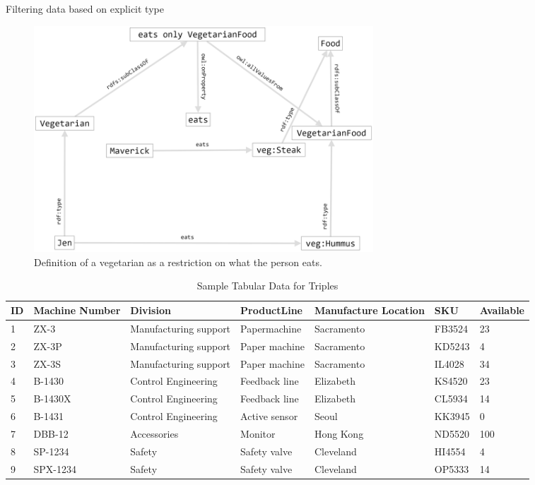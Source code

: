 \begin{challenge}{Filtering data based on explicit type}
\begin{figure}
\centering
\includegraphics[width=5in]{SWWOv3/media/ch12/figure12-9.png}
\caption{Definition of a vegetarian as a restriction on what the person eats.}
\label{fig:ch12.09}
\end{figure}


\begin{table}[h]
\centering
\begin{tabular}{||l l l l l l l ||} 
 \hline
 ID&Machine Number&Division&ProductLine&Manufacture Location&SKU&Available \\ 
 \hline\hline
1&ZX-3&Manufacturing support&Papermachine&Sacramento&FB3524&23\\
2&ZX-3P&Manufacturing support&Paper machine&Sacramento&KD5243&4\\
3&ZX-3S&Manufacturing support&Paper machine&Sacramento&IL4028&34\\
4&B-1430&Control Engineering&Feedback line&Elizabeth&KS4520&23\\
5&B-1430X&Control Engineering&Feedback line&Elizabeth&CL5934&14\\
6&B-1431&Control Engineering&Active sensor&Seoul&KK3945&0\\
7&DBB-12&Accessories&Monitor&Hong Kong&ND5520&100\\
8&SP-1234&Safety&Safety valve&Cleveland&HI4554&4\\
9&SPX-1234&Safety&Safety valve&Cleveland&OP5333&14\\
\hline
\end{tabular}
\caption{Sample Tabular Data for Triples}
\label{tab:ch12.1}
\end{table}



\end{challenge}
